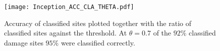 \begin{figure}
  \texttt{[image: Inception\_ACC\_CLA\_THETA.pdf]}
\caption{Accuracy of classified sites plotted together with the ratio of classified sites against the threshold. At $\theta=0.7$ of the $92\%$ classified damage sites $95\%$ were classified correctly.}
\label{fig:InceptionACC_EFF_THETA}
\end{figure}


